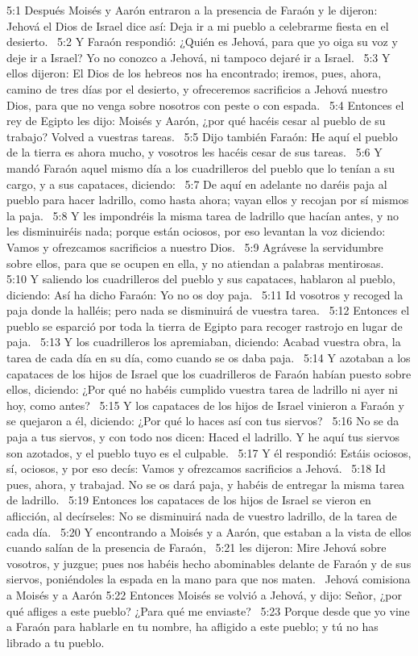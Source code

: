 5:1 Después Moisés y Aarón entraron a la presencia de Faraón y le dijeron: Jehová el Dios de Israel dice así: Deja ir a mi pueblo a celebrarme fiesta en el desierto.  
5:2 Y Faraón respondió: ¿Quién es Jehová, para que yo oiga su voz y deje ir a Israel? Yo no conozco a Jehová, ni tampoco dejaré ir a Israel.  
5:3 Y ellos dijeron: El Dios de los hebreos nos ha encontrado; iremos, pues, ahora, camino de tres días por el desierto, y ofreceremos sacrificios a Jehová nuestro Dios, para que no venga sobre nosotros con peste o con espada.  
5:4 Entonces el rey de Egipto les dijo: Moisés y Aarón, ¿por qué hacéis cesar al pueblo de su trabajo? Volved a vuestras tareas.  
5:5 Dijo también Faraón: He aquí el pueblo de la tierra es ahora mucho, y vosotros les hacéis cesar de sus tareas.  
5:6 Y mandó Faraón aquel mismo día a los cuadrilleros del pueblo que lo tenían a su cargo, y a sus capataces, diciendo:  
5:7 De aquí en adelante no daréis paja al pueblo para hacer ladrillo, como hasta ahora; vayan ellos y recojan por sí mismos la paja.  
5:8 Y les impondréis la misma tarea de ladrillo que hacían antes, y no les disminuiréis nada; porque están ociosos, por eso levantan la voz diciendo: Vamos y ofrezcamos sacrificios a nuestro Dios.  
5:9 Agrávese la servidumbre sobre ellos, para que se ocupen en ella, y no atiendan a palabras mentirosas.  
5:10 Y saliendo los cuadrilleros del pueblo y sus capataces, hablaron al pueblo, diciendo: Así ha dicho Faraón: Yo no os doy paja.  
5:11 Id vosotros y recoged la paja donde la halléis; pero nada se disminuirá de vuestra tarea.  
5:12 Entonces el pueblo se esparció por toda la tierra de Egipto para recoger rastrojo en lugar de paja.  
5:13 Y los cuadrilleros los apremiaban, diciendo: Acabad vuestra obra, la tarea de cada día en su día, como cuando se os daba paja.  
5:14 Y azotaban a los capataces de los hijos de Israel que los cuadrilleros de Faraón habían puesto sobre ellos, diciendo: ¿Por qué no habéis cumplido vuestra tarea de ladrillo ni ayer ni hoy, como antes?  
5:15 Y los capataces de los hijos de Israel vinieron a Faraón y se quejaron a él, diciendo: ¿Por qué lo haces así con tus siervos?  
5:16 No se da paja a tus siervos, y con todo nos dicen: Haced el ladrillo. Y he aquí tus siervos son azotados, y el pueblo tuyo es el culpable.  
5:17 Y él respondió: Estáis ociosos, sí, ociosos, y por eso decís: Vamos y ofrezcamos sacrificios a Jehová.  
5:18 Id pues, ahora, y trabajad. No se os dará paja, y habéis de entregar la misma tarea de ladrillo.  
5:19 Entonces los capataces de los hijos de Israel se vieron en aflicción, al decírseles: No se disminuirá nada de vuestro ladrillo, de la tarea de cada día.  
5:20 Y encontrando a Moisés y a Aarón, que estaban a la vista de ellos cuando salían de la presencia de Faraón,  
5:21 les dijeron: Mire Jehová sobre vosotros, y juzgue; pues nos habéis hecho abominables delante de Faraón y de sus siervos, poniéndoles la espada en la mano para que nos maten.  
Jehová comisiona a Moisés y a Aarón 
5:22 Entonces Moisés se volvió a Jehová, y dijo: Señor, ¿por qué afliges a este pueblo? ¿Para qué me enviaste?  
5:23 Porque desde que yo vine a Faraón para hablarle en tu nombre, ha afligido a este pueblo; y tú no has librado a tu pueblo.  
